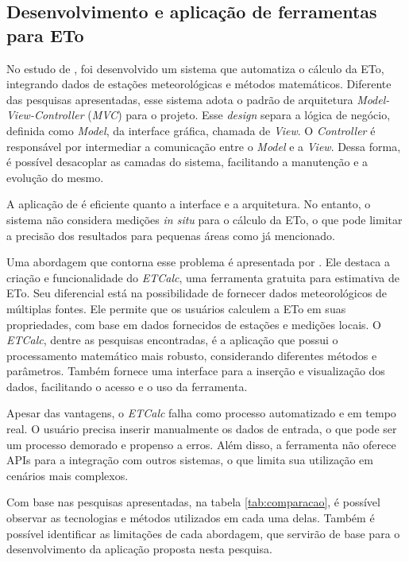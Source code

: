 \subsection{Desenvolvimento e aplicação de ferramentas para ETo}
No estudo de \textcite{Taison_webeva2019}, foi desenvolvido um sistema que automatiza o cálculo da ETo, integrando dados de estações meteorológicas e métodos matemáticos. Diferente das pesquisas apresentadas, esse sistema adota o padrão de arquitetura \textit{Model-View-Controller} (\textit{MVC}) para o projeto. Esse \textit{design} separa a lógica de negócio, definida como \textit{Model}, da interface gráfica, chamada de \textit{View}. O \textit{Controller} é responsável por intermediar a comunicação entre o \textit{Model} e a \textit{View}. Dessa forma, é possível desacoplar as camadas do sistema, facilitando a manutenção e a evolução do mesmo.

A aplicação de \textcite{Taison_webeva2019} é eficiente quanto a interface e a arquitetura. No entanto, o sistema não considera medições \textit{in situ} para o cálculo da ETo, o que pode limitar a precisão dos resultados para pequenas áreas como já mencionado. 

Uma abordagem que contorna esse problema é apresentada por \textcite{Serban_webeva2022}. Ele destaca a criação e funcionalidade do \textit{ETCalc}, uma ferramenta gratuita para estimativa de ETo. Seu diferencial está na possibilidade de fornecer dados meteorológicos de múltiplas fontes. Ele permite que os usuários calculem a ETo em suas propriedades, com base em dados fornecidos de estações e medições locais. O \textit{ETCalc}, dentre as pesquisas encontradas, é a aplicação que possui o processamento matemático mais robusto, considerando diferentes métodos e parâmetros. Também fornece uma interface para a inserção e visualização dos dados, facilitando o acesso e o uso da ferramenta.

Apesar das vantagens, o \textit{ETCalc} falha como processo automatizado e em tempo real. O usuário precisa inserir manualmente os dados de entrada, o que pode ser um processo demorado e propenso a erros. Além disso, a ferramenta não oferece APIs para a integração com outros sistemas, o que limita sua utilização em cenários mais complexos.

Com base nas pesquisas apresentadas, na tabela \ref{tab:comparacao}, é possível observar as tecnologias e métodos utilizados em cada uma delas. Também é possível identificar as limitações de cada abordagem, que servirão de base para o desenvolvimento da aplicação proposta nesta pesquisa.

